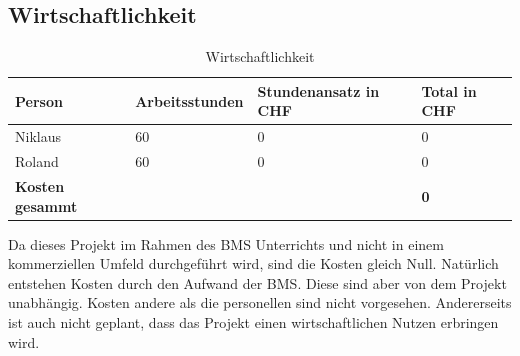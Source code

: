 \documentclass[11pt,paper=a4,final]{scrartcl}
\begin{document}
\subsection{Wirtschaftlichkeit}
\begin{table}[h!]
  \centering
  \begin{tabular}{|l|l|l|l|}\hline
    \bf Person & \bf Arbeitsstunden & \bf Stundenansatz in CHF & \bf Total in
    CHF \\ \hline
    Niklaus & 60 & 0 & 0 \\ \hline
    Roland & 60 & 0 & 0 \\ \hline
    \bf Kosten gesammt &  & & \bf 0 \\ \hline
  \end{tabular}
  \caption{Wirtschaftlichkeit}
  \label{tab:wirtschaftlichkeit}
\end{table}
Da dieses Projekt im Rahmen des BMS Unterrichts und nicht in einem kommerziellen
Umfeld durchgef\"uhrt wird, sind die Kosten gleich Null. Nat\"urlich entstehen
Kosten durch den Aufwand der BMS. Diese sind aber von dem Projekt unabh\"angig.
Kosten andere als die personellen sind nicht vorgesehen. Andererseits ist auch
nicht geplant, dass das Projekt einen wirtschaftlichen Nutzen erbringen wird.
\end{document}

